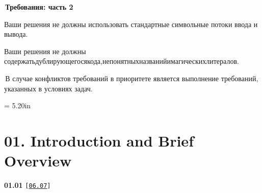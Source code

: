 \documentclass[a4paper,12pt]{article}
\renewenvironment{itemize}
{
    \begin{list}{\labelitemi}
    {
      \setlength{\topsep}{0pt}
      \setlength{\partopsep}{0pt}
      \setlength{\parskip}{0pt}
      \setlength{\itemsep}{0pt}
      \setlength{\parsep}{0pt}
      \setlength{\leftmargin}{14.5pt}
    }
}{\end{list}}
\begin{document}
\bigskip

\,\textbf{Требования: часть 2}

\medskip

\begin{itemize}

    \item Ваши решения не должны использовать стандартные символьные потоки ввода и вывода.

    \smallskip

    \item Ваши решения не должны содержать\;дублирующегося\;кода,\;непонятных\;названий\;и\;магических\;литералов.

\end{itemize}

\bigskip

\,В случае конфликтов требований в приоритете является выполнение требований, указанных в условиях задач.



\newpage\thispagestyle{empty}\pdfpageheight = 5.20in

\section{01. Introduction and Brief Overview}

{\large \textbf{01.01} \texttt{[\href{https://github.com/i-s-m-mipt/Education/blob/master/projects/examples/source/06.07.cpp}{\texttt{06.07}}]}} 

\bigskip
\end{document}
